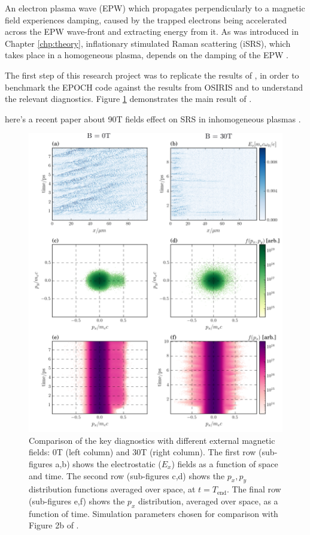 An electron plasma wave (\acrshort{EPW}) which propagates perpendicularly to a magnetic field experiences damping, caused by the trapped electrons being accelerated across the EPW wave-front and extracting energy from it. As was introduced in Chapter \ref{chp:theory}, inflationary stimulated Raman scattering (\acrshort{iSRS}), which takes place in a homogeneous plasma, depends on the damping of the EPW .

The first step of this research project was to replicate the results of \citet{Winjum2018}, in order to benchmark the EPOCH code against the results from OSIRIS and to understand the relevant diagnostics. Figure \ref{fig:WinjumRep} demonstrates the main result of \citet{Winjum2018}.

here's a recent paper about 90T fields effect on SRS in inhomogeneous plasmas \citep{Zhou2021}. 



\begin{figure}[ht]
   \centering
    \includegraphics[width=\columnwidth]{Chapters/C6_magSRS/Winjum_rep_megaPlot_label.pdf}
    \caption{Comparison of the key diagnostics with different external magnetic fields: 0T (left column) and 30T (right column). The first row (sub-figures a,b) shows the electrostatic ($E_x$) fields as a function of space and time. The second row (sub-figures c,d) shows the $p_x,p_y$ distribution functions averaged over space, at $t=T_{\mathrm{end}}$. The final row (sub-figures e,f) shows the $p_x$ distribution, averaged over space, as a function of time. Simulation parameters chosen for comparison with Figure 2b of \citet{Winjum2018}.}
    \label{fig:WinjumRep}
\end{figure}{}


